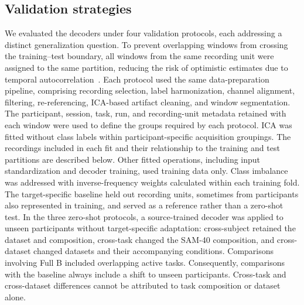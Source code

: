 \documentclass[10pt,letterpaper]{article}
\newcommand{\rev}[1]{#1}
\newcommand{\revs}[1]{#1}
\begin{document}
\subsection*{\revs{Validation strategies}}

\rev{We evaluated the decoders under four validation protocols, each addressing a distinct generalization question. To prevent overlapping windows from crossing the training--test boundary, all windows from the same recording unit were assigned to the same partition, reducing the risk of optimistic estimates due to temporal autocorrelation~\cite{chen2025hybrid}. Each protocol used the same data-preparation pipeline, comprising recording selection, label harmonization, channel alignment, filtering, re-referencing, ICA-based artifact cleaning, and window segmentation. The participant, session, task, run, and recording-unit metadata retained with each window were used to define the groups required by each protocol. ICA was fitted without class labels within participant-specific acquisition groupings. The recordings included in each fit and their relationship to the training and test partitions are described below. Other fitted operations, including input standardization and decoder training, used training data only. Class imbalance was addressed with inverse-frequency weights calculated within each training fold. The target-specific baseline held out recording units, sometimes from participants also represented in training, and served as a reference rather than a zero-shot test. In the three zero-shot protocols, a source-trained decoder was applied to unseen participants without target-specific adaptation: cross-subject retained the dataset and composition, cross-task changed the SAM-40 composition, and cross-dataset changed datasets and their accompanying conditions. Comparisons involving Full B included overlapping active tasks. Consequently, comparisons with the baseline always include a shift to unseen participants. Cross-task and cross-dataset differences cannot be attributed to task composition or dataset alone.}
\end{document}
